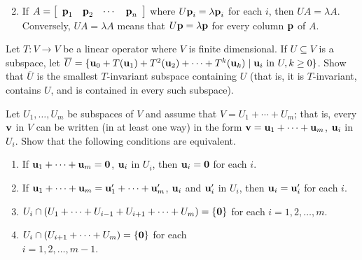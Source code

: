 \begin{multicols}{2}
\begin{ex}
\begin{enumerate}[label={\alph*.}]
\end{enumerate}
\begin{sol}
\begin{enumerate}[label={\alph*.}]
\setcounter{enumi}{1}
\item If $A = \left[ \begin{array}{cccc} \textbf{p}_{1} & \textbf{p}_2 & \cdots & \textbf{p}_{n} \end{array} \right]$ where $U\textbf{p}_{i} = \lambda\textbf{p}_{i}$ for each $i$, then $UA = \lambda A$. Conversely, $UA = \lambda A$ means that $U\textbf{p} = \lambda\textbf{p}$ for every column $\textbf{p}$ of $A$.

\end{enumerate}
\end{sol}
\end{ex}

\begin{ex}
Let $T : V \to V$ be a linear operator where $V$ is finite dimensional. If $U \subseteq V$ is a subspace, let $\overline{U} = \{ \textbf{u}_0 + T(\textbf{u}_1) + T^2(\textbf{u}_2) + \cdots + T^k(\textbf{u}_k) \mid \textbf{u}_i \mbox{ in } U, k \geq 0 \}$. Show that $\overline{U}$ is the smallest $T$-invariant subspace containing $U$ (that is, it is $T$-invariant, contains $U$, and is contained in every such subspace).
\end{ex}

\begin{ex}
Let $U_{1}, \dots, U_{m}$ be subspaces of $V$ and assume that $V = U_{1} + \cdots + U_{m}$; that is, every $\textbf{v}$ in $V$ can be written (in at least one way) in the form $\textbf{v} = \textbf{u}_{1} + \cdots + \textbf{u}_{m}$, $\textbf{u}_{i}$ in $U_{i}$. Show that the following conditions are equivalent.


\begin{enumerate}[label={\roman*.}]
\item If $\textbf{u}_{1} + \cdots + \textbf{u}_{m} = \textbf{0}$, $\textbf{u}_{i}$ in $U_{i}$, then $\textbf{u}_{i} = \textbf{0}$ for each $i$.

\item If $\textbf{u}_{1} + \cdots + \textbf{u}_{m} = \textbf{u}^{\prime}_{1} + \cdots + \textbf{u}^{\prime}_{m}$, $\textbf{u}_{i}$ and $\textbf{u}^{\prime}_{i}$ in $U_{i}$, then $\textbf{u}_{i} = \textbf{u}^{\prime}_{i}$ for each $i$.

\item $U_{i} \cap (U_{1} + \cdots + U_{i-1} + U_{i+1} + \cdots + U_{m}) = \{\textbf{0}\}$ for each $i = 1, 2, \dots, m$.

\item $U_{i} \cap (U_{i+1} + \cdots + U_{m}) = \{\textbf{0}\}$ for each \\ $i = 1, 2, \dots, m - 1$.


\end{enumerate}
\end{ex}
\end{multicols}
